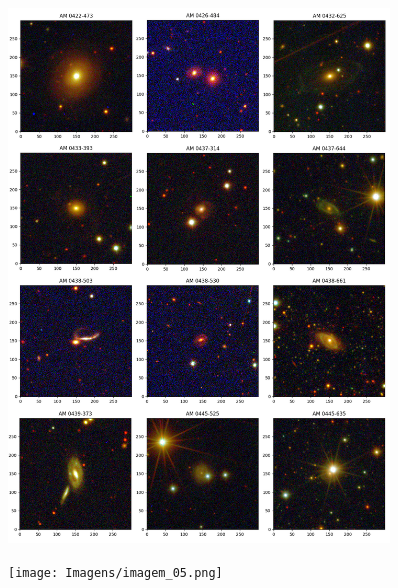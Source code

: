 \begin{anexosenv}
    \begin{figure}[h]
        \centering 
        \includegraphics[width=0.9\textwidth]{Imagens/imagem_04.png} 
        \caption[]{}
        \label{fig:imagem_04} 
    \end{figure}

    \begin{figure}[h]
        \centering 
        \texttt{[image: Imagens/imagem\_05.png]} 
        \caption[]{}
        \label{fig:imagem_05} 
    \end{figure}


\end{anexosenv}

